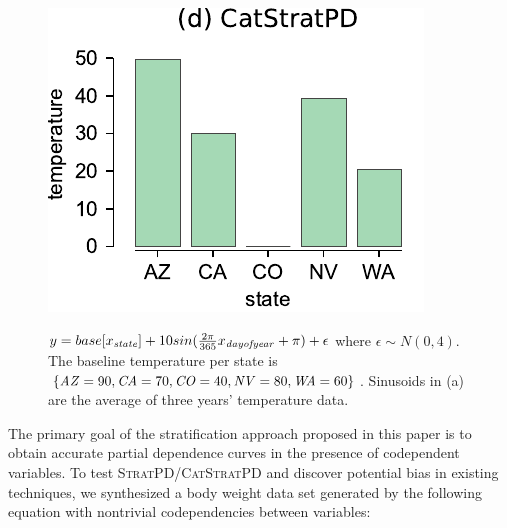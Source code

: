 \documentclass{article}
\newcommand{\spd}{\fontfamily{cmr}\textsc{\small StratPD}}
\newcommand{\cspd}{\fontfamily{cmr}\textsc{\small CatStratPD}}
\begin{document}
\begin{figure}[htbp]
\begin{center}
\includegraphics[scale=0.45]{images/state_vs_temp_stratpd.pdf}~~
\caption{\small $y = base[x_{\it state}] + 10 sin(\frac{2\pi}{365}x_{\it dayofyear}+\pi) + \epsilon$ where $\epsilon \sim N(0, 4)$. The baseline temperature per state is $\{{\it AZ}=90, {\it CA}=70, {\it CO}=40, {\it NV}=80, {\it WA}=60\}$. Sinusoids in (a) are the average of three years' temperature data.}
\label{fig:statetemp}
\end{center}
\end{figure}

The primary goal of the stratification approach proposed in this paper is to obtain accurate partial dependence curves in the presence of codependent variables. To test \spd{}/\cspd{} and discover potential bias in existing techniques, we synthesized a body weight data set generated by the following equation with nontrivial codependencies between variables:
\end{document}
